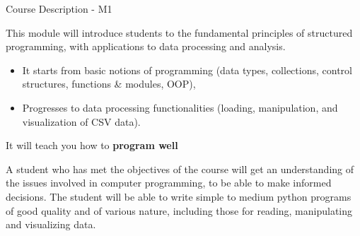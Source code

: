 \documentclass{beamer}%
\begin{document}


\begin{frame}{Course Description - M1}
\begin{block}{This module will }
introduce students to the fundamental principles of structured programming, with applications to data processing and analysis. 
\begin{itemize}
	\item It starts from basic notions of programming (data types, collections, control structures, functions \& modules, OOP),
	\item Progresses to data processing functionalities (loading, manipulation, and visualization of CSV data).
\end{itemize}
It will teach you how to \textbf{program well}
\end{block}

\pause

\begin{block}{A student who has met the objectives of the course will get}
an understanding of the issues involved in computer programming, to be able to make informed decisions. The student will be able to write simple to medium python programs of good quality and of various nature, including those for reading, manipulating and visualizing data. %
\end{block}
\end{frame}
\end{document}
